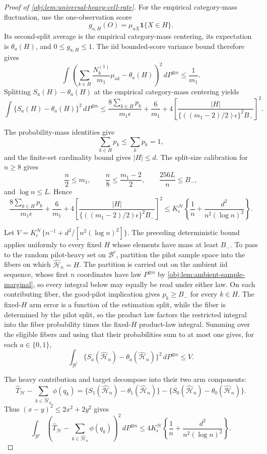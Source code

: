 \begin{proof}[Proof of \cref{obj:lem:universal-heavy-cell-rate}]
For the empirical category-mass fluctuation, use the one-observation score
\[
g_{a,H}(O)=\mu_{aX}\mathbf 1\{X\in H\}.
\]
Its second-split average is the empirical category-mass centering, its expectation is
\(\theta_a(H)\), and \(0\le g_{a,H}\le1\). The iid bounded-score variance bound therefore gives
\[
\int
\left(
\sum_{k\in H}\frac{N_k^{(1)}}{m_1}\mu_{ak}-\theta_a(H)
\right)^2
\,dP^{\otimes n}
\le \frac1{m_1}.
\] %
Splitting \(S_a(H)-\theta_a(H)\) at the empirical category-mass centering yields
\[
\int \{S_a(H)-\theta_a(H)\}^2\,dP^{\otimes n}
\le
\frac{8\sum_{k\in H}p_k}{m_1\epsilon}
+
\frac6{m_1}
+
4\left[
\frac{|H|}
{\{((m_1-2)/2)\epsilon\}^2 B_-}
\right]^2 .
\] %

The probability-mass identities give
\[
\sum_{k\in H}p_k\le\sum_k p_k=1,
\]
and the finite-set cardinality bound gives \(|H|\le d\). The split-size calibration for
\(n\ge8\) gives
\[
\frac n2\le m_1,
\qquad
\frac n8\le\frac{m_1-2}{2},
\qquad
\frac{256L}{n}\le B_-,
\]
and \(\log n\le L\). Hence
\[
\frac{8\sum_{k\in H}p_k}{m_1\epsilon}
+
\frac6{m_1}
+
4\left[
\frac{|H|}
{\{((m_1-2)/2)\epsilon\}^2 B_-}
\right]^2
\le
K^{\mathcal H}_\epsilon
\left\{
\frac1n+\frac{d^2}{n^2(\log n)^2}
\right\}.
\] %

Let \(V=K^{\mathcal H}_\epsilon\{n^{-1}+d^2/[n^2(\log n)^2]\}\). The preceding deterministic bound applies
uniformly to every fixed \(H\) whose elements have mass at least \(B_-\). To pass to the random
pilot-heavy set on \(\mathcal B^c\), partition the pilot sample space into the fibers on which
\(\widehat{\mathcal H}_n=H\). The partition is carried out on the ambient iid sequence, whose
first \(n\) coordinates have law \(P^{\otimes n}\) by \cref{obj:lem:ambient-sample-marginal}, so
every integral below may equally be read under either law. On each contributing fiber, the
good-pilot implication gives
\(p_k\ge B_-\) for every \(k\in H\). The fixed-\(H\) arm error is a function of the estimation
split, while the fiber is determined by the pilot split, so the product law factors the restricted
integral into the fiber probability times the fixed-\(H\) product-law integral. Summing over the
eligible fibers and using that their probabilities sum to at most one gives, for each
\(a\in\{0,1\}\),
\[
\int_{\mathcal B^c}
\{S_a(\widehat{\mathcal H}_n)-\theta_a(\widehat{\mathcal H}_n)\}^2
\,dP^{\otimes n}
\le V.
\] %

The heavy contribution and target decompose into their two arm components:
\[
\widehat T_{\mathcal H}
-
\sum_{k\in\widehat{\mathcal H}_n}\phi(q_k)
=
\{S_1(\widehat{\mathcal H}_n)-\theta_1(\widehat{\mathcal H}_n)\}
-
\{S_0(\widehat{\mathcal H}_n)-\theta_0(\widehat{\mathcal H}_n)\}.
\] %
Thus \((x-y)^2\le2x^2+2y^2\) gives
\[
\int_{\mathcal B^c}
\left(
\widehat T_{\mathcal H}
-
\sum_{k\in\widehat{\mathcal H}_n}\phi(q_k)
\right)^2
\,dP^{\otimes n}
\le
4K^{\mathcal H}_\epsilon
\left\{
\frac1n+\frac{d^2}{n^2(\log n)^2}
\right\}.
\] %


\end{proof}
